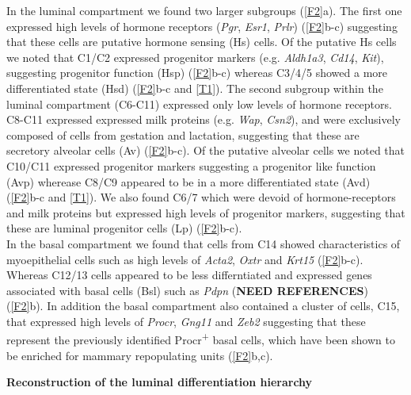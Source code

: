 \documentclass[titlepage, 12pt, oneside]{amsart}
\begin{document}
In the luminal compartment we found two larger subgroups (\autoref{F2}a).
The first one expressed high levels of hormone receptors (\textit{Pgr}, \textit{Esr1}, \textit{Prlr}) (\autoref{F2}b-c) suggesting that these cells are putative hormone sensing (Hs) cells.
Of the putative Hs cells we noted that C1/C2 expressed progenitor markers (e.g. \textit{Aldh1a3}, \textit{Cd14}, \textit{Kit})\autocite{Shehata2012}, suggesting progenitor function (Hsp) (\autoref{F2}b-c) whereas C3/4/5 showed a more differentiated state (Hsd) (\autoref{F2}b-c and \autoref{T1}).
The second subgroup within the luminal compartment (C6-C11) expressed only low levels of hormone receptors.
C8-C11 expressed expressed milk proteins (e.g. \textit{Wap}, \textit{Csn2}), and were exclusively composed of cells from gestation and lactation, suggesting that these are secretory alveolar cells (Av) (\autoref{F2}b-c).
Of the putative alveolar cells we noted that C10/C11 expressed progenitor markers suggesting a progenitor like function (Avp) wherease C8/C9 appeared to be in a more differentiated state (Avd) (\autoref{F2}b-c and \autoref{T1}).
We also found C6/7 which were devoid of hormone-receptors and milk proteins but expressed high levels of progenitor markers, suggesting that these are luminal progenitor cells (Lp) (\autoref{F2}b-c).\\

In the basal compartment we found that cells from C14 showed characteristics of myoepithelial cells such as high levels of \textit{Acta2}, \textit{Oxtr} and \textit{Krt15} (\autoref{F2}b-c).
Whereas C12/13 cells appeared to be less differntiated and expressed genes associated with basal cells (Bsl) such as \textit{Pdpn} (\textbf{NEED REFERENCES}) (\autoref{F2}b).
In addition the basal compartment also contained a cluster of cells, C15, that expressed high levels of \textit{Procr}, \textit{Gng11} and \textit{Zeb2} suggesting that these represent the previously identified Procr\textsuperscript{+}  basal cells, which have been shown to be enriched for mammary repopulating units\autocite{Wang2015} (\autoref{F2}b,c).

\textbf{Reconstruction of the luminal differentiation hierarchy}
\end{document}
